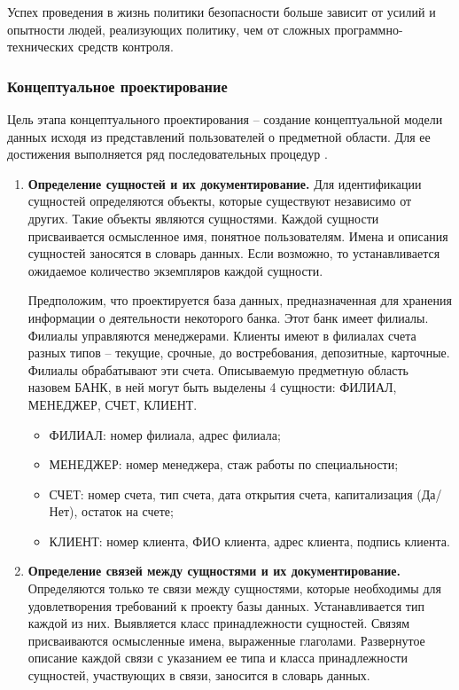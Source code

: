 Успех проведения в жизнь политики безопасности больше зависит от усилий и опытности людей, реализующих политику,
чем от сложных программно-технических средств контроля.

\subsubsection{Концептуальное проектирование}

Цель этапа концептуального проектирования – создание концептуальной модели данных исходя из представлений
пользователей о предметной области. Для ее достижения выполняется ряд последовательных процедур \autocite{oscerko}.
\begin{enumerate}
	\item \textbf{Определение сущностей и их документирование.}
	Для идентификации сущностей определяются объекты, которые существуют независимо от других. Такие объекты
	являются сущностями. Каждой сущности присваивается осмысленное имя, понятное пользователям. Имена и
	описания сущностей заносятся в словарь данных. Если возможно, то устанавливается ожидаемое количество
	экземпляров каждой сущности.
	
	Предположим, что проектируется база данных, предназначенная для хранения информации о деятельности некоторого банка. Этот банк
	имеет филиалы. Филиалы управляются менеджерами. Клиенты имеют в филиалах счета разных типов – текущие, срочные, до востребования, депозитные, карточные.
	Филиалы обрабатывают эти счета. Описываемую предметную область назовем БАНК, в ней могут быть выделены 4 сущности: ФИЛИАЛ, МЕНЕДЖЕР, СЧЕТ, КЛИЕНТ.
	\begin{itemize}
		
		\item ФИЛИАЛ: номер филиала, адрес филиала;
		
		\item МЕНЕДЖЕР: номер менеджера, стаж работы по специальности;
		
		\item СЧЕТ: номер счета, тип счета, дата открытия счета, капитализация (Да/Нет), остаток на счете;
		
		\item КЛИЕНТ: номер клиента, ФИО клиента, адрес клиента, подпись клиента.
		
	\end{itemize}
	
	\item \textbf{Определение связей между сущностями и их документирование.}
	Определяются только те связи между сущностями, которые необходимы для удовлетворения требований к проекту
	базы данных. Устанавливается тип каждой из них. Выявляется класс принадлежности сущностей. Связям
	присваиваются осмысленные имена, выраженные глаголами. Развернутое описание каждой связи с указанием ее
	типа и класса принадлежности сущностей, участвующих в связи, заносится в словарь данных.
	

\end{enumerate}
